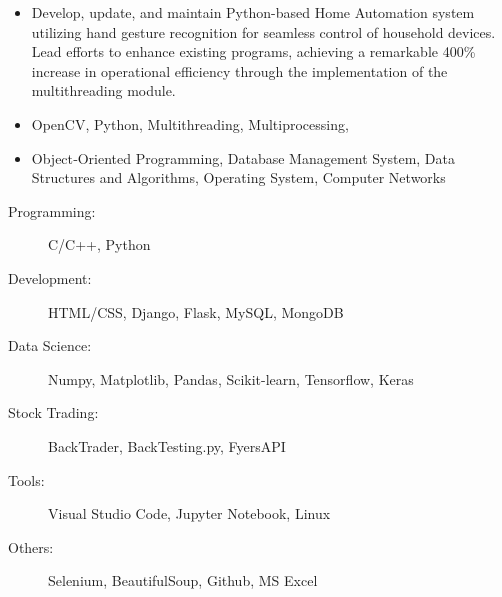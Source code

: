 \documentclass[10pt,a4paper,ragged2e,withhyper,total={8.3in, 11.7in}]{altacv}
\begin{document}
\begin{paracol}{2}

\begin{itemize}
\item 
Develop, update, and maintain Python-based Home Automation system utilizing hand gesture recognition for seamless control of household devices. Lead efforts to enhance existing programs, achieving a remarkable 400\% increase in operational efficiency through the implementation of the multithreading module.
\item OpenCV, Python, Multithreading, Multiprocessing, 
\end{itemize}



\begin{itemize}
\item Object‐Oriented Programming, Database Management System, Data Structures and Algorithms, Operating System, Computer Networks
 

\end{itemize}

\switchcolumn
{}
\begin{description}
        \item[Programming:] C/C++, Python
        \item[Development:] HTML/CSS, Django, Flask, MySQL, MongoDB
        \item[Data Science:] Numpy, Matplotlib, Pandas, Scikit-learn, Tensorflow, Keras
        \item[Stock Trading:] BackTrader, BackTesting.py, FyersAPI
        \item[Tools:] Visual Studio Code, Jupyter Notebook, Linux
        \item[Others:] Selenium, BeautifulSoup, Github, MS Excel
        

\end{description}
\end{paracol}
\end{document}
